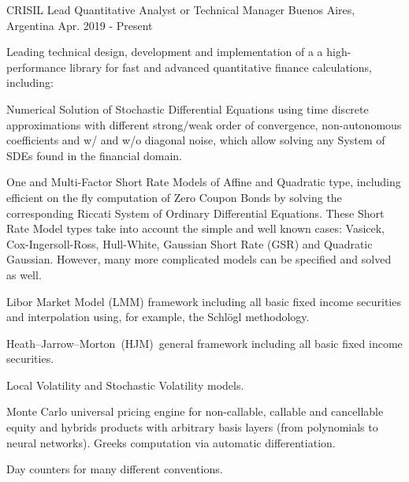 
\begin{cventries}

  \cventry
    {CRISIL}
    {Lead Quantitative Analyst or Technical Manager}
    {Buenos Aires, Argentina}
    {Apr. 2019 - Present}
    {
      \begin{cvitems}
        \item{Leading technical design, development and implementation of a a
        high-performance library for fast and advanced quantitative finance calculations,
        including:
          \vspace{+6.0mm}
          \begin{cvitems}
              \item Numerical Solution of Stochastic Differential Equations using time
              discrete approximations with different strong/weak order of convergence,
              non-autonomous coefficients and w/ and w/o diagonal noise, which allow solving
              any System of SDEs found in the financial domain.
              \item One and Multi-Factor Short Rate Models of Affine and Quadratic type,
              including efficient on the fly computation of Zero Coupon Bonds by solving the
              corresponding Riccati System of Ordinary Differential Equations. These Short
              Rate Model types take into account the simple and well known cases: Vasicek,
              Cox-Ingersoll-Ross, Hull-White, Gaussian Short Rate (GSR) and Quadratic
              Gaussian. However, many more complicated models can be specified and solved as
              well.
              \item Libor Market Model (LMM) framework including all basic fixed income
              securities and interpolation using, for example, the Schlögl methodology.
              \item Heath–Jarrow–Morton (HJM) general framework including all basic fixed
              income securities.
              \item Local Volatility and Stochastic Volatility models.
              \item Monte Carlo universal pricing engine for non-callable, callable and
              cancellable equity and hybrids products with arbitrary basis layers (from
              polynomials to neural networks). Greeks computation via automatic
              differentiation.
              \item Day counters for many different conventions.

\end{cvitems}}
\end{cvitems}}
\end{cventries}
